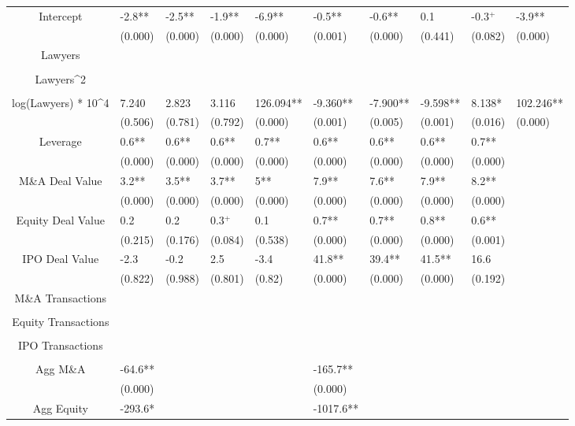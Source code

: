 \documentclass{article}
\begin{document}
\begin{table}[H]
\begin{tabular}{|clllllllll|}
Intercept & -2.8** & -2.5** & -1.9** & -6.9** & -0.5** & -0.6** & 0.1 & -0.3$^{+}$ & -3.9** \\
   & (0.000) & (0.000) & (0.000) & (0.000) & (0.001) & (0.000) & (0.441) & (0.082) & (0.000) \\
  Lawyers &  &  &  &  &  &  &  &  &  \\
   &  &  &  &  &  &  &  &  &  \\
  Lawyers^2 &  &  &  &  &  &  &  &  &  \\
   &  &  &  &  &  &  &  &  &  \\
  log(Lawyers) * 10^4 & 7.240 & 2.823 & 3.116 & 126.094** & -9.360** & -7.900** & -9.598** & 8.138* & 102.246** \\
   & (0.506) & (0.781) & (0.792) & (0.000) & (0.001) & (0.005) & (0.001) & (0.016) & (0.000) \\
  Leverage & 0.6** & 0.6** & 0.6** & 0.7** & 0.6** & 0.6** & 0.6** & 0.7** &  \\
   & (0.000) & (0.000) & (0.000) & (0.000) & (0.000) & (0.000) & (0.000) & (0.000) &  \\
  M\&A Deal Value & 3.2** & 3.5** & 3.7** & 5** & 7.9** & 7.6** & 7.9** & 8.2** &  \\
   & (0.000) & (0.000) & (0.000) & (0.000) & (0.000) & (0.000) & (0.000) & (0.000) &  \\
  Equity Deal Value & 0.2 & 0.2 & 0.3$^{+}$ & 0.1 & 0.7** & 0.7** & 0.8** & 0.6** &  \\
   & (0.215) & (0.176) & (0.084) & (0.538) & (0.000) & (0.000) & (0.000) & (0.001) &  \\
  IPO Deal Value & -2.3 & -0.2 & 2.5 & -3.4 & 41.8** & 39.4** & 41.5** & 16.6 &  \\
   & (0.822) & (0.988) & (0.801) & (0.82) & (0.000) & (0.000) & (0.000) & (0.192) &  \\
  M\&A Transactions &  &  &  &  &  &  &  &  &  \\
   &  &  &  &  &  &  &  &  &  \\
  Equity Transactions &  &  &  &  &  &  &  &  &  \\
   &  &  &  &  &  &  &  &  &  \\
  IPO Transactions &  &  &  &  &  &  &  &  &  \\
   &  &  &  &  &  &  &  &  &  \\
  Agg M\&A & -64.6** &  &  &  & -165.7** &  &  &  &  \\
   & (0.000) &  &  &  & (0.000) &  &  &  &  \\
  Agg Equity & -293.6* &  &  &  & -1017.6** &  &  &  &  \\

\end{tabular}
\end{table}
\end{document}
